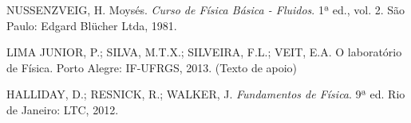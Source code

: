 \documentclass[brazilian,12pt,a4paper,final]{article}
\begin{document}
\begin{thebibliography}{99}

NUSSENZVEIG, H. Moysés. {\em Curso de Física Básica - Fluidos}. 1ª ed., vol. 2. São Paulo: Edgard Blücher Ltda, 1981.

LIMA JUNIOR, P.; SILVA, M.T.X.; SILVEIRA, F.L.; VEIT, E.A. O laboratório de Física. Porto Alegre: IF-UFRGS, 2013. (Texto de apoio)

HALLIDAY, D.; RESNICK, R.; WALKER, J. {\em Fundamentos de Física}. 9ª ed. Rio de Janeiro: LTC, 2012.

\end{thebibliography}
\end{document}

